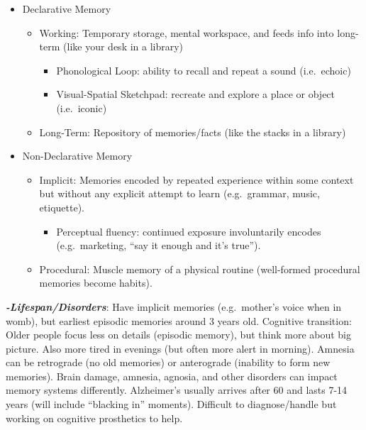 \documentclass[
]{article}
\providecommand{\tightlist}{%
  \setlength{\itemsep}{0pt}\setlength{\parskip}{0pt}}
\begin{document}
\begin{itemize}
\item
  Declarative Memory

  \begin{itemize}
  \item
    Working: Temporary storage, mental workspace, and feeds info into
    long-term (like your desk in a library)

    \begin{itemize}
    \item
      Phonological Loop: ability to recall and repeat a sound
      (i.e.~echoic)
    \item
      Visual-Spatial Sketchpad: recreate and explore a place or object
      (i.e.~iconic)
    \end{itemize}
  \item
    Long-Term: Repository of memories/facts (like the stacks in a
    library)
  \end{itemize}
\item
  Non-Declarative Memory

  \begin{itemize}
  \item
    Implicit: Memories encoded by repeated experience within some
    context but without any explicit attempt to learn (e.g.~grammar,
    music, etiquette).

    \begin{itemize}
    \tightlist
    \item
      Perceptual fluency: continued exposure involuntarily encodes
      (e.g.~marketing, ``say it enough and it's true'').
    \end{itemize}
  \item
    Procedural: Muscle memory of a physical routine (well-formed
    procedural memories become habits).
  \end{itemize}
\end{itemize}

\textbf{\emph{-Lifespan/Disorders}}: Have implicit memories
(e.g.~mother's voice when in womb), but earliest episodic memories
around 3 years old. Cognitive transition: Older people focus less on
details (episodic memory), but think more about big picture. Also more
tired in evenings (but often more alert in morning). Amnesia can be
retrograde (no old memories) or anterograde (inability to form new
memories). Brain damage, amnesia, agnosia, and other disorders can
impact memory systems differently. Alzheimer's usually arrives after 60
and lasts 7-14 years (will include ``blacking in'' moments). Difficult
to diagnose/handle but working on cognitive prosthetics to help.
\end{document}

